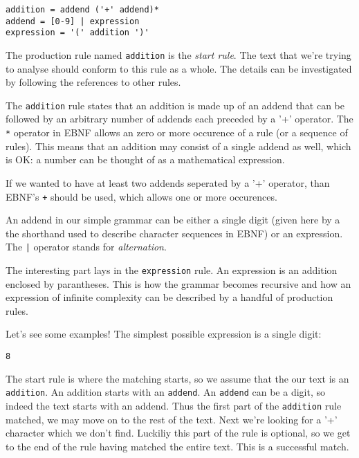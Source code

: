 \documentclass[12pt]{article}
\begin{document}
\begin{center}
	\begin{minipage}[h]{0.5\textwidth}
		\begin{lstlisting}[breaklines=true]
addition = addend ('+' addend)*
addend = [0-9] | expression
expression = '(' addition ')'
		\end{lstlisting}
	\end{minipage}
\end{center}

The production rule named \texttt{addition} is the \emph{start rule}. The text that we're trying to analyse
should conform to this rule as a whole. The details can be investigated by following the references to other
rules.

The \texttt{addition} rule states that an addition is made up of an addend that can be followed by an
arbitrary number of addends each preceded by a '+' operator. The \texttt{*} operator in EBNF allows an zero or
more occurence of a rule (or a sequence of rules). This means that an addition may consist of a single addend
as well, which is OK: a number can be thought of as a mathematical expression.

If we wanted to have at least two addends seperated by a '+' operator, than EBNF's \texttt{+} should be used,
which allows one or more occurences.

An addend in our simple grammar can be either a single digit (given here by a the shorthand used to describe
character sequences in EBNF) or an expression. The \texttt{|} operator stands for \emph{alternation}.

The interesting part lays in the \texttt{expression} rule. An expression is an addition enclosed by
parantheses. This is how the grammar becomes recursive and how an expression of infinite complexity can be
described by a handful of production rules.

Let's see some examples! The simplest possible expression is a single digit:

\begin{center}
	\begin{minipage}[h]{0.1\textwidth}
		\begin{lstlisting}[breaklines=true]
8
		\end{lstlisting}
	\end{minipage}
\end{center}

The start rule is where the matching starts, so we assume that the our text is an \texttt{addition}. An addition starts
with an \texttt{addend}. An \texttt{addend} can be a digit, so indeed the text starts with an addend. Thus the
first part of the \texttt{addition} rule matched, we may move on to the rest of the text. Next we're looking
for a '+' character which we don't find. Luckiliy this part of the rule is optional, so we get to the end of
the rule having matched the entire text. This is a successful match.
\end{document}
